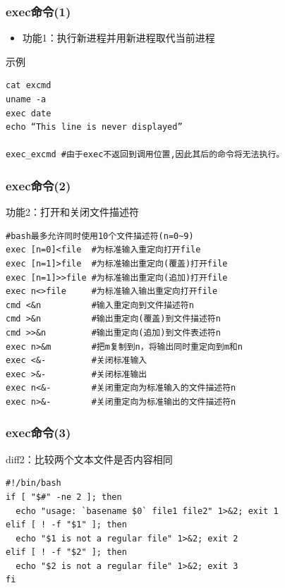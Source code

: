 \documentclass[xcolor=svgnames,presentation]{beamer}
\begin{document}
\begin{frame}[fragile]
\frametitle{exec命令(1)}
\label{sec-1-3-3}
\begin{itemize}

\item 功能1：执行新进程并用新进程取代当前进程
\label{sec-1-3-3-1}%
\end{itemize} %
\begin{exampleblock}{示例}
\label{sec-1-3-3-2}


\begin{verbatim}
cat excmd
uname -a
exec date
echo “This line is never displayed”

exec_excmd #由于exec不返回到调用位置,因此其后的命令将无法执行。
\end{verbatim}
\end{exampleblock}
\end{frame}
\begin{frame}[fragile]
\frametitle{exec命令(2)}
\label{sec-1-3-4}
\begin{exampleblock}{功能2：打开和关闭文件描述符}
\label{sec-1-3-4-1}


\begin{verbatim}
#bash最多允许同时使用10个文件描述符(n=0~9)
exec [n=0]<file  #为标准输入重定向打开file
exec [n=1]>file  #为标准输出重定向(覆盖)打开file
exec [n=1]>>file #为标准输出重定向(追加)打开file
exec n<>file     #为标准输入输出重定向打开file
cmd <&n          #输入重定向到文件描述符n
cmd >&n          #输出重定向(覆盖)到文件描述符n
cmd >>&n         #输出重定向(追加)到文件表述符n
exec n>&m        #把m复制到n，将输出同时重定向到m和n
exec <&-         #关闭标准输入
exec >&-         #关闭标准输出
exec n<&-        #关闭重定向为标准输入的文件描述符n
exec n>&-        #关闭重定向为标准输出的文件描述符n
\end{verbatim}
\end{exampleblock}
\end{frame}
\begin{frame}[fragile]
\frametitle{exec命令(3)}
\label{sec-1-3-5}
\begin{exampleblock}{diff2：比较两个文本文件是否内容相同}
\label{sec-1-3-5-1}


\begin{verbatim}
#!/bin/bash
if [ "$#" -ne 2 ]; then
  echo "usage: `basename $0` file1 file2" 1>&2; exit 1
elif [ ! -f "$1" ]; then
  echo "$1 is not a regular file" 1>&2; exit 2
elif [ ! -f "$2" ]; then
  echo "$2 is not a regular file" 1>&2; exit 3
fi
\end{verbatim}
\end{exampleblock}
\end{frame}
\end{document}
